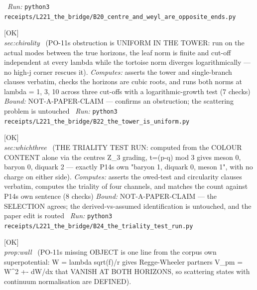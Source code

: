 \begin{description}
\ \emph{Run:} \texttt{python3 receipts/L221\_the\_bridge/B20\_centre\_and\_weyl\_are\_opposite\_ends.py}
\item[\label{rcpt:B22_the_tower_is_uniform}\textbf{}\quad\texttt{B22\_the\_tower\_is\_uniform}]\hfill\textsf{[OK]}\\
\textit{sec:chirality} \ (PO-11s obstruction is UNIFORM IN THE TOWER: run on the actual modes between the true horizons, the leaf norm is finite and cut-off independent at every lambda while the tortoise norm diverges logarithmically --- no high-j corner rescues it). 
\emph{Computes:} asserts the tower and single-branch clauses verbatim, checks the horizons are cubic roots, and runs both norms at lambda = 1, 3, 10 across three cut-offs with a logarithmic-growth test (7 checks)
 \emph{Bound:} NOT-A-PAPER-CLAIM --- confirms an obstruction; the scattering problem is untouched
\ \emph{Run:} \texttt{python3 receipts/L221\_the\_bridge/B22\_the\_tower\_is\_uniform.py}
\item[\label{rcpt:B24_the_triality_test_run}\textbf{}\quad\texttt{B24\_the\_triality\_test\_run}]\hfill\textsf{[OK]}\\
\textit{sec:whichthree} \ (THE TRIALITY TEST RUN: computed from the COLOUR CONTENT alone via the centres Z\_3 grading, t=(p-q) mod 3 gives meson 0, baryon 0, diquark 2 --- exactly P14s own "baryon 1, diquark 0, meson 1", with no charge on either side). 
\emph{Computes:} asserts the owed-test and circularity clauses verbatim, computes the triality of four channels, and matches the count against P14s own sentence (8 checks)
 \emph{Bound:} NOT-A-PAPER-CLAIM --- the SELECTION agrees; the derived-vs-assumed identification is untouched, and the paper edit is routed
\ \emph{Run:} \texttt{python3 receipts/L221\_the\_bridge/B24\_the\_triality\_test\_run.py}
\item[\label{rcpt:B25_the_scattering_object_exists}\textbf{}\quad\texttt{B25\_the\_scattering\_object\_exists}]\hfill\textsf{[OK]}\\
\textit{prop:wall} \ (PO-11s missing OBJECT is one line from the corpus own superpotential: W = lambda sqrt(f)/r gives Regge-Wheeler partners V\_pm = W\textasciicircum{}2 +- dW/dx that VANISH AT BOTH HORIZONS, so scattering states with continuum normalisation are DEFINED). 

\end{description}
